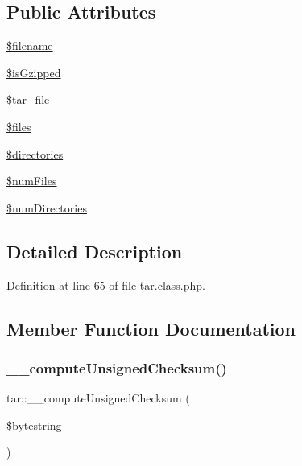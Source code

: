 \subsection*{Public Attributes}
\begin{DoxyCompactItemize}
\item 
\hyperlink{classtar_af99384023359a00770ca0ffb858b21fb}{\$filename}
\item 
\hyperlink{classtar_a82771381c948bca4c166212276fe4b46}{\$is\+Gzipped}
\item 
\hyperlink{classtar_afea782413237d583b7611a1c5410f2c5}{\$tar\+\_\+file}
\item 
\hyperlink{classtar_a2082ab6894219b27e42024e925c4e11f}{\$files}
\item 
\hyperlink{classtar_a03d6b15a492e4917989d2577372dcb58}{\$directories}
\item 
\hyperlink{classtar_a03d688d94a5fa92720ff9b1c03e7c157}{\$num\+Files}
\item 
\hyperlink{classtar_a2406f376692c41ad3e3a62cf473738ec}{\$num\+Directories}
\end{DoxyCompactItemize}


\subsection{Detailed Description}


Definition at line 65 of file tar.\+class.\+php.



\subsection{Member Function Documentation}
\hypertarget{classtar_a2f9a99c49a3ab86475a1cd26e722c0fa}{}\label{classtar_a2f9a99c49a3ab86475a1cd26e722c0fa} 
\subsubsection{\texorpdfstring{\+\_\+\+\_\+compute\+Unsigned\+Checksum()}{\_\_computeUnsignedChecksum()}}
{\footnotesize\ttfamily tar\+::\+\_\+\+\_\+compute\+Unsigned\+Checksum (\begin{DoxyParamCaption}\item[{}]{\$bytestring }\end{DoxyParamCaption})}



